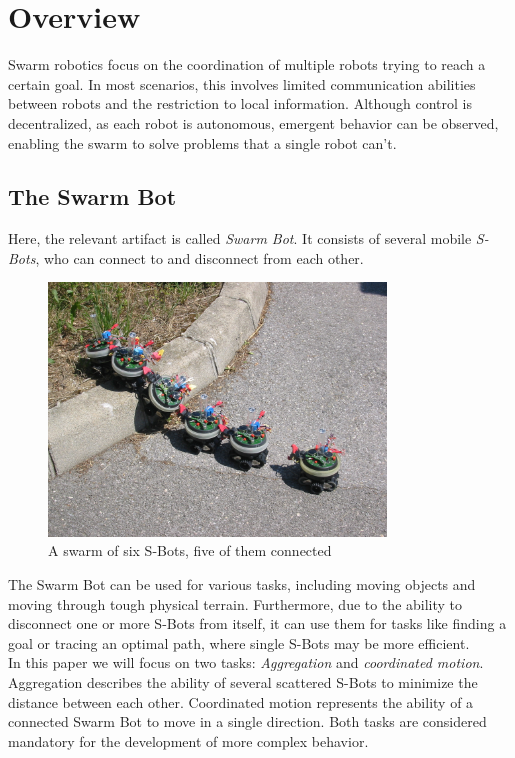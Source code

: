 
\section{Overview}
Swarm robotics focus on the coordination of multiple robots trying to reach a certain goal. In most scenarios, this involves limited communication abilities between robots and the restriction to local information. Although control is decentralized, as each robot is autonomous, emergent behavior can be observed, enabling the swarm to solve problems that a single robot can't.

\subsection{The Swarm Bot}
Here, the relevant artifact is called \emph{Swarm Bot}. It consists of several mobile \emph{S-Bots}, who can connect to and disconnect from each other.
\begin{figure}\centering
\includegraphics[width=0.8\textwidth]{pics/sbots2.jpg}
\caption{A swarm of six S-Bots, five of them connected}
\end{figure}
The Swarm Bot can be used for various tasks, including moving objects and moving through tough physical terrain. Furthermore, due to the ability to disconnect one or more S-Bots from itself, it can use them for tasks like finding a goal or tracing an optimal path, where single S-Bots may be more efficient.\\
In this paper we will focus on two tasks: \emph{Aggregation} and \emph{coordinated motion}. Aggregation describes the ability of several scattered S-Bots to minimize the distance between each other. Coordinated motion represents the ability of a connected Swarm Bot to move in a single direction. Both tasks are considered mandatory for the development of more complex behavior.

